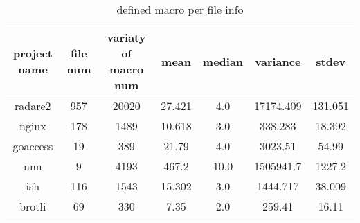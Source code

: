 \begin{table}[h]
	\caption{defined macro per file info}
	\label{table:defined_macro_info}	
		\begin{tabular}{ccccccc}
		\hline
		project name & file num & variaty of macro num & mean & median & variance & stdev \\ 
		\hline \hline
		radare2 & 957 & 20020 & 27.421 & 4.0 & 17174.409 & 131.051 \\ 
		\hline
		nginx & 178 & 1489 & 10.618 & 3.0 & 338.283 & 18.392 \\ 
		\hline
		goaccess & 19 & 389 & 21.79 & 4.0 & 3023.51 & 54.99 \\ 
		\hline
		nnn & 9 & 4193 & 467.2 & 10.0 & 1505941.7 & 1227.2 \\ 
		\hline
		ish & 116 & 1543 & 15.302 & 3.0 & 1444.717 & 38.009 \\ 
		\hline
		brotli & 69 & 330 & 7.35 & 2.0 & 259.41 & 16.11 \\ 
		\hline
	\end{tabular}
\end{table}
